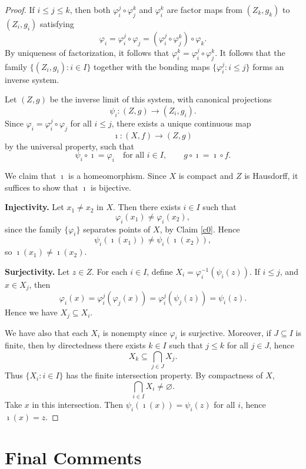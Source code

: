 \documentclass[12pt]{amsart}
\theoremstyle{definition}
\numberwithin{equation}{section}
\theoremstyle{remark}
\begin{document}
\begin{proof}
If $i\le j\le k$, then both $\varphi_i^j\circ \varphi_j^k$ and $\varphi_i^k$ are factor maps from $(Z_k,g_k)$ to $(Z_i,g_i)$ satisfying
\[
\varphi_i
=
\varphi_i^j\circ \varphi_j
=
(\varphi_i^j\circ \varphi_j^k)\circ \varphi_k.
\]
By uniqueness of factorization, it follows that
$
\varphi_i^k=\varphi_i^j\circ \varphi_j^k.
$
It follows that the family $\{(Z_i,g_i):i\in I\}$ together with the bonding maps $\{\varphi_i^j:i\le j\}$ forms an inverse system.

Let $(Z,g)$ be the inverse limit of this system, with canonical projections
\[
\psi_i:(Z,g)\to (Z_i,g_i).
\]
Since $\varphi_i=\varphi_i^j\circ \varphi_j$ for all $i\le j$, there exists a unique continuous map
\[
\imath:(X,f)\to (Z,g)
\]
by the universal property, such that
\[
\psi_i\circ \imath=\varphi_i
\quad \text{for all } i\in I,
\qquad
g\circ \imath=\imath\circ f.
\]

We claim that $\imath$ is a homeomorphism. Since $X$ is compact and $Z$ is Hausdorff, it suffices to show that $\imath$ is bijective.

\medskip

\noindent\textbf{Injectivity.}
Let $x_1\ne x_2$ in $X$. Then there exists $i\in I$ such that
\[
\varphi_i(x_1)\ne \varphi_i(x_2),
\]
since the family $\{\varphi_i\}$ separates points of $X$, by Claim \ref{c0}. Hence
\[
\psi_i(\imath(x_1))\ne \psi_i(\imath(x_2)),
\]
so $\imath(x_1)\ne \imath(x_2)$.

\medskip

\noindent\textbf{Surjectivity.}
Let $z\in Z$. For each $i\in I$, define
$
X_i=\varphi_i^{-1}(\psi_i(z)).
$
If $i\leq j$, and $x\in X_j$, then 
\[\varphi_i(x)=\varphi^j_i(\varphi_j(x))=\varphi^j_i(\psi_j(z))=\psi_i(z).\]
Hence we have $X_j\subseteq X_i$.

We have also that each $X_i$ is nonempty since $\varphi_i$ is surjective. Moreover, if $J\subseteq I$ is finite, then by directedness there exists $k\in I$ such that $j\le k$ for all $j\in J$, hence
\[
X_k\subseteq \bigcap_{j\in J} X_j.
\]
Thus $\{X_i:i\in I\}$ has the finite intersection property. By compactness of $X$,
\[
\bigcap_{i\in I} X_i \ne \varnothing.
\]
Take $x$ in this intersection. Then $\psi_i(\imath(x))=\psi_i(z)$ for all $i$, hence $\imath(x)=z$.
\end{proof}

\section{Final Comments}\label{final}
\end{document}

